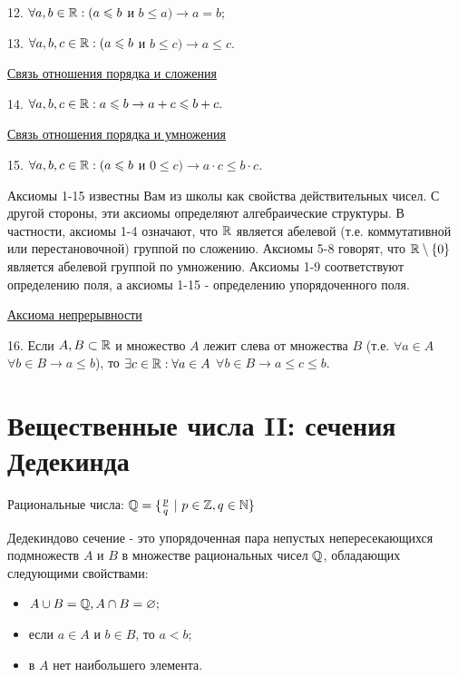 	12. $\forall a, b \in \mathbb R : (a \leqslant b$ и $b \leqslant a) \rightarrow a = b;$
	
	13. $\forall a, b, c \in \mathbb R : (a \leqslant b$ и $b \leqslant c) \rightarrow a \leqslant c.$
	
	\underline{Связь отношения порядка и сложения}
	
	14. $\forall a, b, c \in \mathbb R : a \leqslant b \rightarrow a + c \leqslant b + c.$
	
	\underline{Связь отношения порядка и умножения}
	
	15. $\forall a, b, c \in \mathbb R : (a \leqslant b$ и $0 \leqslant c) \rightarrow a \cdot c \leqslant b \cdot c.$
	
	Аксиомы 1-15 известны Вам из школы как свойства действительных чисел. С другой стороны, эти аксиомы определяют алгебраические структуры. В частности, аксиомы 1-4 означают, что $\mathbb R$ является абелевой (т.е. коммутативной или перестановочной) группой по сложению. Аксиомы 5-8 говорят, что $\mathbb R \setminus \{0\}$ является абелевой группой по умножению. Аксиомы 1-9 соответствуют определению поля, а аксиомы 1-15 - определению упорядоченного поля.
	
	\underline{Аксиома непрерывности}
	
	16. Если $A, B \subset \mathbb R$ и множество $A$ лежит слева от множества $B$ (т.е. $\forall a \in A$ $\forall b \in B \rightarrow a \leqslant b$), то $\exists c \in \mathbb R : \forall a \in A$ $\forall b \in B \rightarrow a \leqslant c \leqslant b.$
	
	\section{Вещественные числа II: сечения Дедекинда}
	
	Рациональные числа: $\mathbb Q = \{\frac{p}{q} \text{ } | \text{ } p \in \mathbb Z, q \in \mathbb N\}$
	
	\begin{definition}
		Дедекиндово сечение - это упорядоченная пара непустых непересекающихся подмножеств $A$ и $B$ в множестве рациональных чисел $\mathbb Q$, обладающих следующими свойствами:
		\begin{itemize}
			\item $A \cup B = \mathbb Q, A \cap B = \varnothing;$
			\item если $a \in A$ и $b \in B$, то $a < b;$
			\item в $A$ нет наибольшего элемента.
		\end{itemize}
	\end{definition}
	
